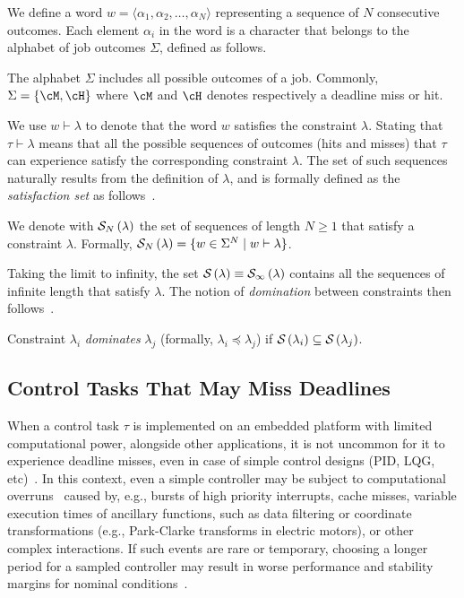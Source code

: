 We define a word $w= \langle \alpha_1, \alpha_2, \dots, \alpha_N \rangle$ representing a sequence of $N$ consecutive outcomes.
Each element $\alpha_i$ in the word is a character that belongs to the alphabet of job outcomes $\Sigma$, defined as follows.

\begin{definition}%
    \label{def:basic-alphabet}%
    The alphabet $\Sigma$ includes all possible outcomes of a job.
    Commonly, $\Sigma = \{ \cM, \cH \}$ where $\cM$ and $\cH$ denotes respectively a deadline miss or hit.
\end{definition}

We use $w \vdash \lambda$ to denote that the word $w$ satisfies the constraint $\lambda$. 
Stating that $\tau \vdash \lambda$ means that all the possible sequences of outcomes (hits and misses) that $\tau$ can experience satisfy the corresponding constraint $\lambda$.
The set of such sequences naturally results from the definition of $\lambda$, and is formally defined as the \emph{satisfaction set} as follows~\cite{Bernat:2001}.

\begin{definition}%
    \label{def:satisfaction}%
    We denote with $\mathcal{S}_{N}\left( \lambda \right)$ the set of sequences of length $N \geq 1$ that satisfy a constraint $\lambda$.
    Formally, $\mathcal{S}_{N}\left( \lambda \right) = \{ w \in \Sigma^N \mid w \vdash \lambda \}$.
\end{definition}
Taking the limit to infinity, the set $\mathcal{S}_{}\left( \lambda \right) \equiv \mathcal{S}_{\infty}\left( \lambda \right)$ contains all the sequences of infinite length that satisfy $\lambda$.
%
The notion of \emph{domination} between constraints then follows~\cite{Bernat:2001}.
\begin{definition}%
    \label{def:domination}%
    Constraint $\lambda_i$ \emph{dominates} $\lambda_j$ (formally, $\lambda_i \preceq \lambda_j$) if $\mathcal{S}_{}\left( \lambda_i \right) \subseteq \mathcal{S}_{}\left( \lambda_j \right)$. 
\end{definition}


\subsection{Control Tasks That May Miss Deadlines}
\label{sec:back_deadline_miss}
When a control task $\tau$ is implemented on an embedded platform with limited computational power, alongside other applications, it is not uncommon for it to experience deadline misses, even in case of simple control designs (PID, LQG, etc)~\cite{akesson2020empirical,pazzaglia2021adaptive}.
In this context, even a simple controller may be subject to computational overruns~\cite{akesson2020empirical} caused by, e.g., bursts of high priority interrupts, cache misses, variable execution times of ancillary functions, such as data filtering or coordinate transformations (e.g., Park-Clarke transforms in electric motors), or other complex interactions.
If such events are rare or temporary, choosing a longer period for a sampled controller may result in worse performance and stability margins for nominal conditions~\cite{Pazzaglia:2019}.

